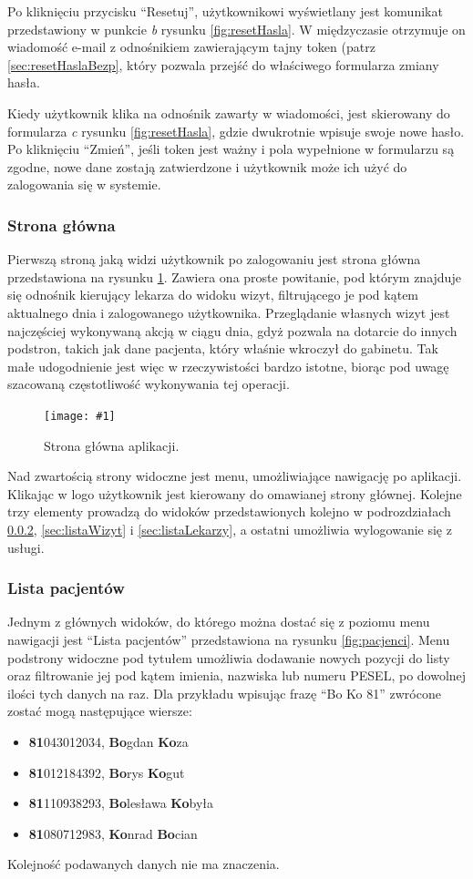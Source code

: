 \documentclass[11pt]{aghdpl}
\newcommand{\fullWidthPicture}[2]{
\begin{figure}[h!]
	\centering
		\texttt{[image: \#1]}
	\caption{#2}
	\label{fig:#1}
\end{figure}
}
\begin{document}
Po kliknięciu przycisku ``Resetuj'', użytkownikowi wyświetlany jest komunikat przedstawiony w punkcie \emph{b} rysunku \ref{fig:resetHasla}. W międzyczasie otrzymuje on wiadomość e-mail z odnośnikiem zawierającym tajny token (patrz \ref{sec:resetHaslaBezp}, który pozwala przejść do właściwego formularza zmiany hasła.

Kiedy użytkownik klika na odnośnik zawarty w wiadomości, jest skierowany do formularza \emph{c} rysunku \ref{fig:resetHasla}, gdzie dwukrotnie wpisuje swoje nowe hasło. Po kliknięciu ``Zmień'', jeśli token jest ważny i pola wypełnione w formularzu są zgodne, nowe dane zostają zatwierdzone i użytkownik może ich użyć do zalogowania się w systemie.

\subsubsection{Strona główna}

Pierwszą stroną jaką widzi użytkownik po zalogowaniu jest strona główna przedstawiona na rysunku \ref{fig:home}. Zawiera ona proste powitanie, pod którym znajduje się odnośnik kierujący lekarza do widoku wizyt, filtrującego je pod kątem aktualnego dnia i zalogowanego użytkownika. Przeglądanie własnych wizyt jest najczęściej wykonywaną akcją w ciągu dnia, gdyż pozwala na dotarcie do innych podstron, takich jak dane pacjenta, który właśnie wkroczył do gabinetu. Tak małe udogodnienie jest więc w rzeczywistości bardzo istotne, biorąc pod uwagę szacowaną częstotliwość wykonywania tej operacji.

\fullWidthPicture{home}{Strona główna aplikacji.}

Nad zwartością strony widoczne jest menu, umożliwiające nawigację po aplikacji. Klikając w logo użytkownik jest kierowany do omawianej strony głównej. Kolejne trzy elementy prowadzą do widoków przedstawionych kolejno w podrozdziałach \ref{sec:listaPacjentow}, \ref{sec:listaWizyt} i \ref{sec:listaLekarzy}, a ostatni umożliwia wylogowanie się z usługi.

\subsubsection{Lista pacjentów}
\label{sec:listaPacjentow}

Jednym z głównych widoków, do którego można dostać się z poziomu menu nawigacji jest ``Lista pacjentów'' przedstawiona na rysunku \ref{fig:pacjenci}. Menu podstrony widoczne pod tytułem umożliwia dodawanie nowych pozycji do listy oraz filtrowanie jej pod kątem imienia, nazwiska lub numeru PESEL, po dowolnej ilości tych danych na raz. Dla przykładu wpisując frazę ``Bo Ko 81'' zwrócone zostać mogą następujące wiersze:
\begin{itemize}
	\item \textbf{81}043012034, \textbf{Bo}gdan \textbf{Ko}za
	\item \textbf{81}012184392, \textbf{Bo}rys \textbf{Ko}gut
	\item \textbf{81}110938293, \textbf{Bo}lesława \textbf{Ko}była
	\item \textbf{81}080712983, \textbf{Ko}nrad \textbf{Bo}cian
\end{itemize}
Kolejność podawanych danych nie ma znaczenia.
\end{document}
